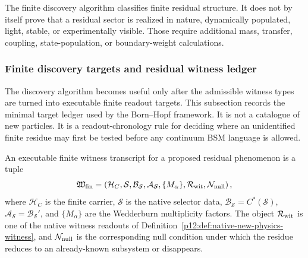 \documentclass[12pt,a4paper]{article}
\begin{document}
\begin{remark}
\label{p12:rem:algorithm-limits}
The finite discovery algorithm classifies finite residual structure.  It does not by itself prove that a residual sector is realized in nature, dynamically populated, light, stable, or experimentally visible.  Those require additional mass, transfer, coupling, state-population, or boundary-weight calculations.
\end{remark}


\subsubsection{Finite discovery targets and residual witness ledger}
\label{p12:subsec:finite-discovery-targets}

The discovery algorithm becomes useful only after the admissible witness types
are turned into executable finite readout targets.  This subsection records the
minimal target ledger used by the Born--Hopf framework.  It is not a catalogue
of new particles.  It is a readout-chronology rule for deciding where an unidentified
finite residue may first be tested before any continuum BSM language is allowed.

\begin{definition}
\label{p12:def:finite-witness-target-transcript}
An executable finite witness transcript for a proposed residual phenomenon is a
tuple
\begin{equation}
\label{p12:eq:finite-witness-target-transcript}
\mathfrak W_{\rm fin}
=
\left(
\mathcal H_C,
\mathcal S,
\mathcal B_{\mathcal S},
\mathcal A_{\mathcal S},
\{M_\alpha\},
\mathcal R_{\rm wit},
\mathcal N_{\rm null}
\right),
\end{equation}
where \(\mathcal H_C\) is the finite carrier, \(\mathcal S\) is the native
selector data, \(\mathcal B_{\mathcal S}=C^\ast(\mathcal S)\),
\(\mathcal A_{\mathcal S}=\mathcal B_{\mathcal S}'\), and
\(\{M_\alpha\}\) are the Wedderburn multiplicity factors.  The object
\(\mathcal R_{\rm wit}\) is one of the native witness readouts of
Definition~\ref{p12:def:native-new-physics-witness}, and
\(\mathcal N_{\rm null}\) is the corresponding null condition under which the
residue reduces to an already-known subsystem or disappears.
\end{definition}
\end{document}
